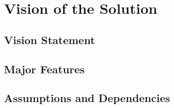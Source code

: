 
\section{Vision of the Solution}
\subsection{Vision Statement}
%
  
\subsection{Major Features}

\subsection{Assumptions and Dependencies}

